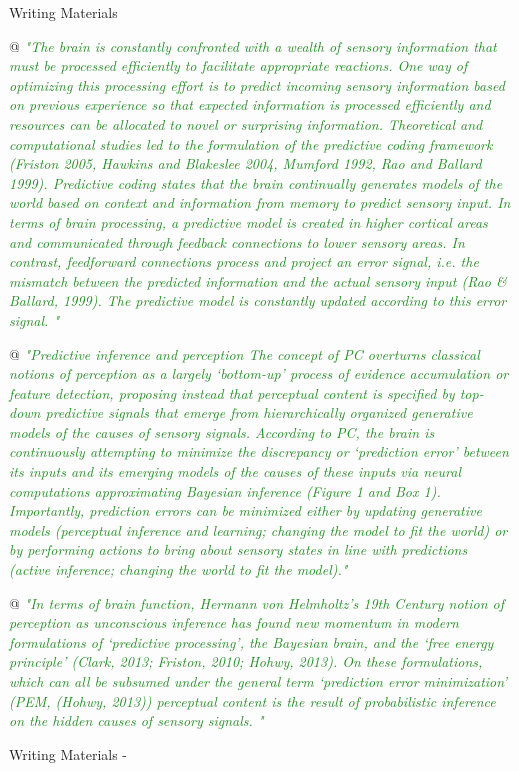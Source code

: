 \documentclass[utf8]{article}
\newenvironment{WritingMaterials} %
    	{
            \begin{tcolorbox}[enhanced,
                title=-,
                size=small,
                colbacktitle=Aquamarine,
                drop fuzzy shadow,
                fontupper=\small,
                boxrule=0.4pt,
                colback=Aquamarine!10!white,
                sharp corners]
                Writing Materials
            \end{tcolorbox}
            \begin{easylist}[itemize]
    	}
    	{
            \end{easylist}  
            \begin{tcolorbox}[enhanced,
                halign=flush right,
                halign title=right,
                size=small,
                colbacktitle=Aquamarine,
                drop fuzzy shadow,
                fontupper=\small,
                boxrule=0.4pt,
                colback=Aquamarine,
                colupper=White,
                sharp corners]
                Writing Materials -
            \end{tcolorbox}        
    	}
\newcommand{\rewrite}[1]{\textcolor{ForestGreen}{\textit{"#1"}}\newline}
\begin{document}
\begin{WritingMaterials}
				@ \rewrite{The brain is constantly confronted with a wealth of sensory information that must be processed efficiently to facilitate appropriate reactions. One way of optimizing this processing effort is to predict incoming sensory information based on previous experience so that expected information is processed efficiently and resources can be allocated to novel or surprising information. Theoretical and computational studies led to the formulation of the predictive coding framework (Friston 2005, Hawkins and Blakeslee 2004, Mumford 1992, Rao and Ballard 1999). Predictive coding states that the brain continually generates models of the world based on context and information from memory to predict sensory input. In terms of brain processing, a predictive model is created in higher cortical areas and communicated through feedback connections to lower sensory areas. In contrast, feedforward connections process and project an error signal, i.e. the mismatch between the predicted information and the actual sensory input (Rao \& Ballard, 1999). The predictive model is constantly updated according to this error signal. }




				@ \rewrite{Predictive inference and perception The concept of PC overturns classical notions of perception as a largely ‘bottom-up’ process of evidence accumulation or feature detection, proposing instead that perceptual content is specified by top-down predictive signals that emerge from hierarchically organized generative models of the causes of sensory signals. According to PC, the brain is continuously attempting to minimize the discrepancy or ‘prediction error’ between its inputs and its emerging models of the causes of these inputs via neural computations approximating Bayesian inference (Figure 1 and Box 1). Importantly, prediction errors can be minimized either by updating generative models (perceptual inference and learning; changing the model to fit the world) or by performing actions to bring about sensory states in line with predictions (active inference; changing the world to fit the model).}

				@ \rewrite{In terms of brain function, Hermann von Helmholtz’s 19th Century notion of perception as unconscious inference has found new momentum in modern formulations of ‘predictive processing’, the Bayesian brain, and the ‘free energy principle’ (Clark, 2013; Friston, 2010; Hohwy, 2013). On these formulations, which can all be subsumed under the general term ‘prediction error minimization’ (PEM, (Hohwy, 2013)) perceptual content is the result of probabilistic inference on the hidden causes of sensory signals. }


\end{WritingMaterials}
\end{document}
